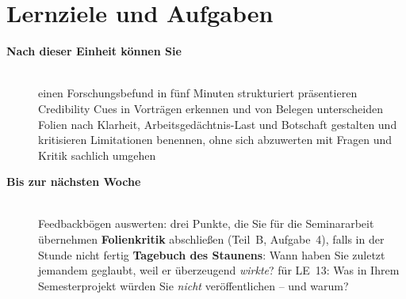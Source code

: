 \section{Lernziele und Aufgaben}
\begin{description}
\item[{\rot\bf Nach dieser Einheit können Sie}]~\\[-\lblskip]
\bi
  \ite einen Forschungsbefund in fünf Minuten strukturiert präsentieren
  \ite Credibility Cues in Vorträgen erkennen und von Belegen
    unterscheiden
  \ite Folien nach Klarheit, Arbeitsgedächtnis-Last und Botschaft
    gestalten und kritisieren
  \ite Limitationen benennen, ohne sich abzuwerten
  \ite mit Fragen und Kritik sachlich umgehen
\ei
\os{\newpage}

\item[{\rot\bf Bis zur nächsten Woche}]~\\[-\lblskip]
\bi
  \ite Feedbackbögen auswerten: drei Punkte, die Sie für die Seminararbeit
    übernehmen
  \ite \textbf{Folienkritik} abschließen (Teil~B, Aufgabe~4), falls in der Stunde
    nicht fertig
  \ite \textbf{Tagebuch des Staunens}: Wann haben Sie zuletzt jemandem
    geglaubt, weil er überzeugend \emph{wirkte}?
  \ite für LE~13: Was in Ihrem Semesterprojekt würden Sie \emph{nicht}
    veröffentlichen -- und warum?
\ei
\os{\newpage}
\end{description}

